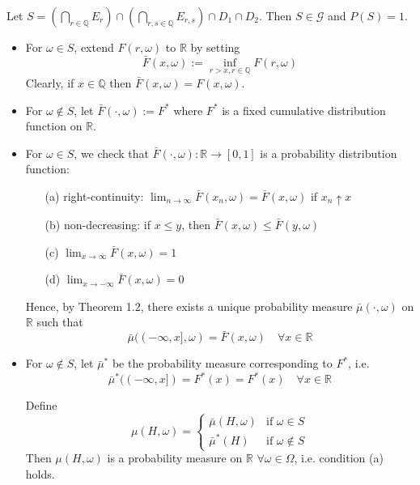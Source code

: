 Let \(S = \left(\bigcap_{r \in \mathbb{Q}} E_r \right) \cap \left(\bigcap_{r,s \in \mathbb{Q}} E_{r,s}\right) \cap D_1 \cap D_2\). Then \(S \in \mathcal{G}\) and \(P(S) = 1\).
\begin{itemize}
    \item For \(\omega \in S\), extend \(F(r, \omega)\) to \(\mathbb{R}\) by setting
    \[
    \bar{F}(x, \omega) := \inf_{r > x, r \in \mathbb{Q}} F(r, \omega)
    \]
    Clearly, if \(x \in \mathbb{Q}\) then \(\bar{F}(x, \omega) = F(x, \omega)\).

    \item For \(\omega \notin S\), let \(\bar{F}(\cdot, \omega) := F^*\) where \(F^*\) is a fixed cumulative distribution function on \(\mathbb{R}\).

    \item For \(\omega \in S\), we check that \(\bar{F}(\cdot, \omega) : \mathbb{R} \to [0,1]\) is a probability distribution function:
    \begin{itemize}
        \item[(a)] right-continuity: \(\lim_{n \to \infty} \bar{F}(x_n, \omega) = \bar{F}(x, \omega)\) if \(x_n \uparrow x\)
        \item[(b)] non-decreasing: if \(x \leq y\), then \(\bar{F}(x, \omega) \leq \bar{F}(y, \omega)\)
        \item[(c)] \(\lim_{x \to \infty} \bar{F}(x, \omega) = 1\)
        \item[(d)] \(\lim_{x \to -\infty} \bar{F}(x, \omega) = 0\)
    \end{itemize}

    Hence, by Theorem 1.2, there exists a unique probability measure \(\bar{\mu}(\cdot, \omega)\) on \(\mathbb{R}\) such that
    \[
    \bar{\mu}((-\infty, x], \omega) = \bar{F}(x, \omega) \quad \forall x \in \mathbb{R}
    \]

    \item For \(\omega \notin S\), let \(\bar{\mu}^*\) be the probability measure corresponding to \(F^*\), i.e.
    \[
    \bar{\mu}^*((-\infty, x]) = F^*(x) = F^*(x) \quad \forall x \in \mathbb{R}
    \]

    Define
    \[
    \mu(H, \omega) =
    \begin{cases}
        \bar{\mu}(H, \omega) & \text{if } \omega \in S \\
        \bar{\mu}^*(H) & \text{if } \omega \notin S
    \end{cases}
    \]
    Then \(\mu(H, \omega)\) is a probability measure on \(\mathbb{R}\) \(\forall \omega \in \Omega\), i.e. condition (a) holds.
\end{itemize}


